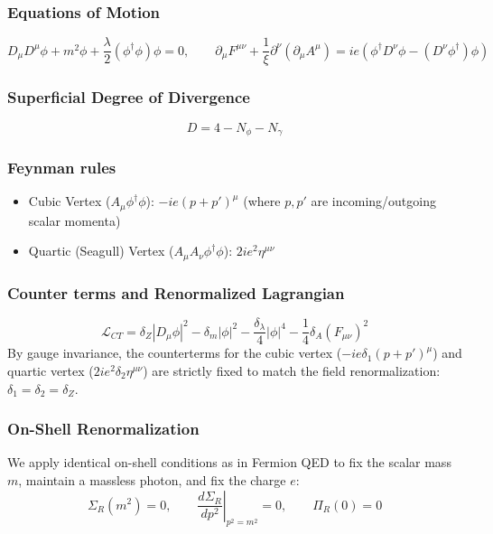 \documentclass{article}
\begin{document}
\subsubsection*{Equations of Motion}
\begin{equation}
    D_\mu D^\mu \phi + m^2\phi + \frac{\lambda}{2}(\phi^\dagger \phi)\phi = 0, \qquad \partial_\mu F^{\mu\nu} + \frac{1}{\xi}\partial^\nu(\partial_\mu A^\mu) = ie(\phi^\dagger D^\nu \phi - (D^\nu\phi^\dagger)\phi)
\end{equation}
\subsubsection*{Superficial Degree of Divergence}
\begin{equation}
    D = 4 - N_\phi - N_\gamma
\end{equation}
\subsubsection*{Feynman rules}
\begin{itemize}
    \item Cubic Vertex ($A_\mu \phi^\dagger \phi$): $-ie(p + p')^\mu$ (where $p, p'$ are incoming/outgoing scalar momenta)
    \item Quartic (Seagull) Vertex ($A_\mu A_\nu \phi^\dagger \phi$): $2ie^2\eta^{\mu\nu}$
\end{itemize}
\subsubsection*{Counter terms and Renormalized Lagrangian}
\begin{equation}
    \mathcal{L}_{CT} = \delta_Z |D_\mu \phi|^2 - \delta_m |\phi|^2 - \frac{\delta_\lambda}{4}|\phi|^4 - \frac{1}{4}\delta_A (F_{\mu\nu})^2
\end{equation}
By gauge invariance, the counterterms for the cubic vertex ($-ie\delta_1(p+p')^\mu$) and quartic vertex ($2ie^2\delta_2\eta^{\mu\nu}$) are strictly fixed to match the field renormalization: $\delta_1 = \delta_2 = \delta_Z$.
\subsubsection*{On-Shell Renormalization}
We apply identical on-shell conditions as in Fermion QED to fix the scalar mass $m$, maintain a massless photon, and fix the charge $e$:
\begin{equation}
    \Sigma_R(m^2) = 0, \qquad \left.\frac{d\Sigma_R}{dp^2}\right|_{p^2=m^2} = 0, \qquad \Pi_R(0) = 0
\end{equation}
\end{document}
